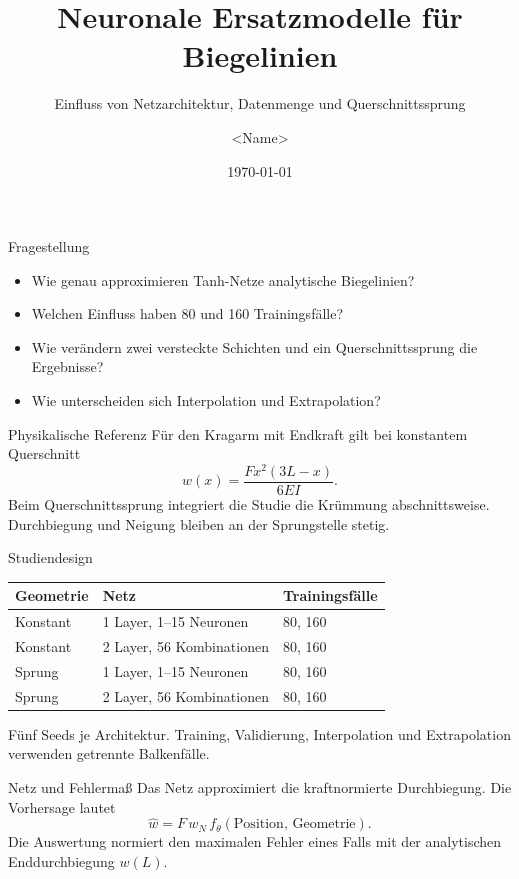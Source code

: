 \documentclass[aspectratio=169,10pt]{beamer}
\title{Neuronale Ersatzmodelle für Biegelinien}
\subtitle{Einfluss von Netzarchitektur, Datenmenge und Querschnittssprung}
\author{<Name>}
\date{\today}
\begin{document}
\maketitle

\begin{frame}{Fragestellung}
\begin{itemize}
  \item Wie genau approximieren Tanh-Netze analytische Biegelinien?
  \item Welchen Einfluss haben 80 und 160 Trainingsfälle?
  \item Wie verändern zwei versteckte Schichten und ein Querschnittssprung die Ergebnisse?
  \item Wie unterscheiden sich Interpolation und Extrapolation?
\end{itemize}
\end{frame}

\begin{frame}{Physikalische Referenz}
Für den Kragarm mit Endkraft gilt bei konstantem Querschnitt
\[
w(x)=\frac{F x^2(3L-x)}{6EI}.
\]
Beim Querschnittssprung integriert die Studie die Krümmung abschnittsweise. Durchbiegung und Neigung bleiben an der Sprungstelle stetig.
\end{frame}

\begin{frame}{Studiendesign}
\begin{center}
\begin{tabular}{lll}
\toprule
Geometrie & Netz & Trainingsfälle\\
\midrule
Konstant & 1 Layer, 1--15 Neuronen & 80, 160\\
Konstant & 2 Layer, 56 Kombinationen & 80, 160\\
Sprung & 1 Layer, 1--15 Neuronen & 80, 160\\
Sprung & 2 Layer, 56 Kombinationen & 80, 160\\
\bottomrule
\end{tabular}
\end{center}
Fünf Seeds je Architektur. Training, Validierung, Interpolation und Extrapolation verwenden getrennte Balkenfälle.
\end{frame}

\begin{frame}{Netz und Fehlermaß}
Das Netz approximiert die kraftnormierte Durchbiegung. Die Vorhersage lautet
\[
\widehat w = F\,w_N\,f_\theta(\text{Position, Geometrie}).
\]
Die Auswertung normiert den maximalen Fehler eines Falls mit der analytischen Enddurchbiegung $w(L)$.
\end{frame}
\end{document}

